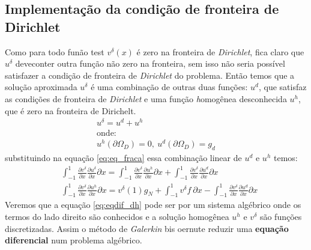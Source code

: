 \subsection{Implementação da condição de fronteira de Dirichlet}
 Como para todo funão test $v^\delta(x)$ é zero na fronteira de \emph{Dirichlet}, fica claro que $u^\delta$ deveconter outra função não zero na fronteira, sem isso não seria possível satisfazer a condição de fronteira de \emph{Dirichlet} do problema. Então temos que a solução aproximada $u^\delta$ é uma combinação de outras duas funções: $u^d$, que satisfaz as condições de fronteira de \emph{Dirichlet} e uma função \emph{h}omogênea desconhecida $u^h$, que é zero na fronteira de Dirichelt.
 \begin{align}
 u^\delta = u^d + u^h \\
 \text{onde:}\\
 u^h(\partial \Omega_D) = 0,\ u^d(\partial \Omega_D) = g_d
 \end{align}
 substituindo na equação \ref{eq:eq_fraca} essa combinação linear de $u^d$ e $u^h$ temos:
 \begin{align}\label{eq:eqdif_dh}
 & \int^{1}_{-1} \frac{\partial v^\delta}{\partial x}  \frac{\partial u^\delta}{\partial x}  \partial x =  \int^{1}_{-1} \frac{\partial v^\delta}{\partial x}  \frac{\partial u^h}{\partial x}  \partial x  +  \int^{1}_{-1} \frac{\partial v^\delta}{\partial x}  \frac{\partial u^d}{\partial x}  \partial x \\
& \int^{1}_{-1} \frac{\partial v^\delta}{\partial x}  \frac{\partial u^h}{\partial x}  \partial x=  v^\delta(1)g_N + \int^{1}_{-1}  v^\delta f\ \partial x -    \int^{1}_{-1} \frac{\partial v^\delta}{\partial x}  \frac{\partial u^d}{\partial x}  \partial x 
 \end{align}
 Veremos que a equação \eqref{eq:eqdif_dh} pode ser por um sistema algébrico onde os termos do lado direito são conhecidos e a solução homogênea $u^h$ e $v^\delta$ são funções discretizadas. Assim o método de \emph{Galerkin} bis oernute reduzir uma \textbf{equação diferencial} num problema algébrico.


